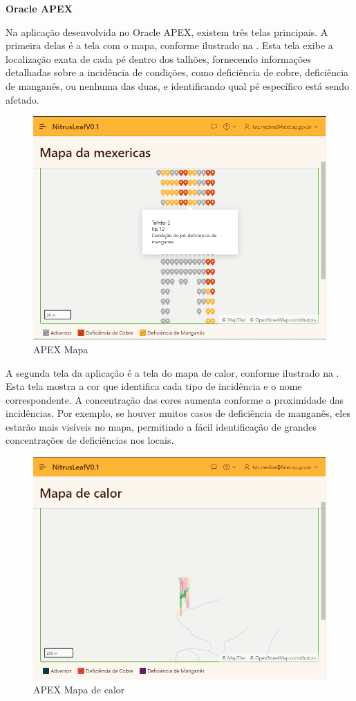 \documentclass[
  a4paper,%
  12pt,%
  english,%
  brazilian,%
]{article}
\begin{document}
\textbf{Oracle APEX}

Na aplicação desenvolvida no Oracle APEX, existem três telas principais. A primeira delas é a tela com o mapa, conforme ilustrado na . Esta tela exibe a localização exata de cada pé dentro dos talhões, fornecendo informações detalhadas sobre a incidência de condições, como deficiência de cobre, deficiência de manganês, ou nenhuma das duas, e identificando qual pé específico está sendo afetado.

\begin{figure}[H]
\centering
\caption{APEX Mapa}%
\label{fig:APEX-mapa}
\includegraphics[width=0.8\linewidth]{Logos/mapa.png}
\end{figure}

A segunda tela da aplicação é a tela do mapa de calor, conforme ilustrado na . Esta tela mostra a cor que identifica cada tipo de incidência e o nome correspondente. A concentração das cores aumenta conforme a proximidade das incidências. Por exemplo, se houver muitos casos de deficiência de manganês, eles estarão mais visíveis no mapa, permitindo a fácil identificação de grandes concentrações de deficiências nos locais.

\begin{figure}[H]
\centering
\caption{APEX Mapa de calor}%
\label{fig:APEX-mapa-de-calor}
\includegraphics[width=0.8\linewidth]{Logos/mapadecalor.png}
\end{figure}
\end{document}
